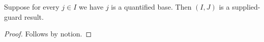 

\begin{theorem}\label{supplied_negative_missing_guard}
    Suppose for every $j\in I$ we have $j$ is a quantified base.
    Then $(I,J)$ is a supplied-guard result.
\end{theorem}
\begin{proof}
    Follows by notion.
\end{proof}
